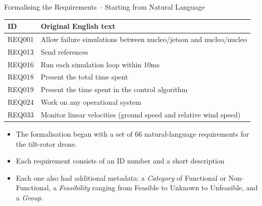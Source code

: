 \documentclass[11pt, aspectratio=169, table]{beamer}
\begin{document}
\begin{frame}{Formalising the Requirements -- Starting from Natural Language}
\begin{table}
    \centering
    \begin{tabular}{|p{}|p{}|}
    \hline
         \textbf{ID} & \textbf{Original English text} \\\hline
         \hline
         REQ001 & Allow failure simulations between nucleo/jetson and nucleo/nucleo \\\hline
         REQ013 & Send references \\\hline %
		 REQ016 & Run each simulation loop within 10ms \\\hline        
         REQ018 & Present the total time spent \\\hline
         REQ019 & Present the time spent in the control algorithm \\\hline
         REQ024 & Work on any operational system \\\hline %
         REQ033 & Monitor linear velocities (ground speed and relative wind speed) \\\hline
         
    \end{tabular}
\end{table}

\begin{block}{}
\begin{itemize}
	\item The formalisation began with a set of 66 natural-language requirements for the tilt-rotor drone.
	
	\item Each requirement consists of an ID number and a short description
	
	\item Each one also had additional metadata: a \textit{Category} of Functional or Non-Functional, a \textit{Feasibility} ranging from Feasible to Unknown to Unfeasible, and a \textit{Group}.
\end{itemize}
\end{block}

\end{frame}
\end{document}
